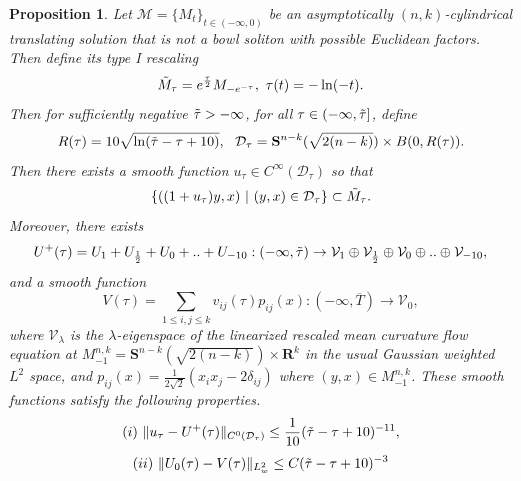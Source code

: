 \documentclass[pdflatex,sn-mathphys-num]{sn-jnl}%
\newtheorem{Proposition}[theorem]{Proposition}
\begin{document}
\begin{Proposition}\label{asymptotic bevaior of nkflows}
    Let $\mathcal{M} = \{M_t\}_{t \in (-\infty, 0)}$ be an asymptotically $(n,k)$-cylindrical translating solution that is not a bowl soliton with possible Euclidean factors. Then define its type I rescaling
    \begin{equation}
        \Tilde{M}_{\tau} = e^{\frac{\tau}{2}}M_{-e^{-\tau}}, \ \tau (t) = -\ln (-t).
    \end{equation}
Then for sufficiently negative $\Tilde{\tau} > -\infty$, for all $\tau \in (-\infty, \Tilde{\tau}]$, define
\begin{equation}
    R(\tau) = 10\sqrt{\ln(\Tilde{\tau} - \tau + 10)}, \ \ \mathcal{D}_{\tau} = \mathbf{S}^{n-k}(\sqrt{2(n-k)}) \times  B(0, R(\tau)).
\end{equation}
Then there exists a smooth function $u_{\tau} \in C^{\infty}(\mathcal{D}_{\tau})$ so that
\begin{equation}
    \{((1 + u_{\tau})y, x )\ |\ (y,x) \in \mathcal{D}_{\tau}\} \subset \Tilde{M}_{\tau} .
\end{equation}
Moreover, there exists 
\begin{equation}
    U^+(\tau) = U_1 + U_{\frac{1}{2}} +U_0 + .. + U_{-10} : (-\infty, \Tilde{\tau}) \to \mathcal{V}_{1}\oplus\mathcal{V}_{\frac{1}{2}}\oplus\mathcal{V}_{0}\oplus..\oplus \mathcal{V}_{-10},
\end{equation}
and a smooth function
\begin{equation}
    V(\tau) = \sum_{1 \leq i,j\leq k}v_{ij}(\tau)p_{ij}(x) : (-\infty, \overline{T}) \to \mathcal{V}_0,
\end{equation}
where $\mathcal{V}_{\lambda}$ is the $\lambda$-eigenspace of the linearized rescaled mean curvature flow equation at $M^{n,k}_{-1} = \mathbf{S}^{n-k}(\sqrt{2(n-k)}) \times \mathbf{R}^k$ in the usual Gaussian weighted $L^2$ space, and $p_{ij}(x) = \frac{1}{2\sqrt{2}}(x_ix_j - 2\delta_{ij})$ where $(y,x) \in M^{n,k}_{-1}$. These smooth functions satisfy the following properties.
\begin{equation}\label{asymptotic expansion existence by bamler lai}
    (i)\ \|u_{\tau} - U^+(\tau)\|_{C^{0}(\mathcal{D}_{\tau})} \leq \frac{1}{10}(\Tilde{\tau} - \tau + 10)^{-11},
\end{equation}
\begin{equation}\label{appx asymptotic expansion by bamler lai}
   (ii)\ \|U_0(\tau) - V(\tau)\|_{L^2_{w}} \leq C(\Tilde{\tau} - \tau + 10)^{-3} 
\end{equation}

\end{Proposition}
\end{document}
